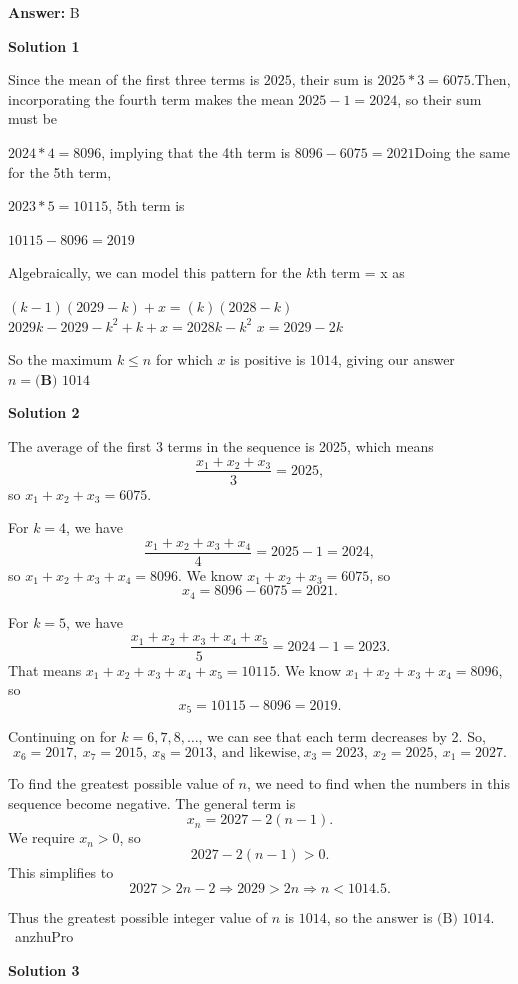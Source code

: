 \begin{enumerate}
 \textbf{Answer: }B



\textbf{Solution 1}

Since the mean of the first three terms is $2025$, their sum is $2025 * 3 = 6075$.Then, incorporating the fourth term makes the mean $2025-1=2024$, so their sum must be 

 $2024 * 4 = 8096$, implying that the 4th term is $8096-6075=2021$Doing the same for the 5th term,

 $2023 * 5= 10115$, 5th term is 

 $10115-8096=2019$

 Algebraically, we can model this pattern for the $k$th term = x as

 $(k-1)(2029-k) + x = (k)(2028-k)$
$2029k-2029-k^2+k+x=2028k-k^2$
$x=2029-2k$

 So the maximum $k\le n$ for which $x$ is positive is $1014$, giving our answer $n=\boxed{\textbf{(B) }1014}$




\textbf{Solution 2}

The average of the first 3 terms in the sequence is 2025, which means 
 \[\frac{x_1 + x_2 + x_3}{3} = 2025,\] so $x_1 + x_2 + x_3 = 6075$.

 For $k = 4$, we have 
 \[\frac{x_1 + x_2 + x_3 + x_4}{4} = 2025 - 1 = 2024,\] so $x_1 + x_2 + x_3 + x_4 = 8096$. We know $x_1 + x_2 + x_3 = 6075$, so 
 \[x_4 = 8096 - 6075 = 2021.\]

 For $k = 5$, we have 
 \[\frac{x_1 + x_2 + x_3 + x_4 + x_5}{5} = 2024 - 1 = 2023.\] That means $x_1 + x_2 + x_3 + x_4 + x_5 = 10115$. We know $x_1 + x_2 + x_3 + x_4 = 8096$, so 
 \[x_5 = 10115 - 8096 = 2019.\]

 Continuing on for $k = 6, 7, 8, \ldots$, we can see that each term decreases by 2. So, 
 \[x_6 = 2017,\ x_7 = 2015,\ x_8 = 2013,\ \text{and likewise,}\ x_3 = 2023,\ x_2 = 2025,\ x_1 = 2027.\]

 To find the greatest possible value of $n$, we need to find when the numbers in this sequence become negative. The general term is 
 \[x_n = 2027 - 2(n-1).\] We require $x_n > 0$, so 
 \[2027 - 2(n-1) > 0.\] This simplifies to 
 \[2027 > 2n - 2 \Rightarrow 2029 > 2n \Rightarrow n < 1014.5.\]

 Thus the greatest possible integer value of $n$ is $1014$, so the answer is $\text{(B) } 1014$. ~anzhuPro

 



\textbf{Solution 3}


\end{enumerate}
